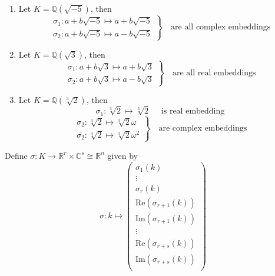 \begin{example}
    \begin{enumerate}
        \item Let $K=\mathbb{Q}(\sqrt{-5})$, then 
        \[
        \left.\begin{aligned}
            \sigma_{1}:a+b\sqrt{-5}\mapsto a+b\sqrt{-5}\\
            \sigma_{2}:a+b\sqrt{-5}\mapsto a-b\sqrt{-5}
        \end{aligned}\right\} \quad \text{are all complex embeddings}
        \]
        \item Let $K=\mathbb{Q}(\sqrt{3})$, then  
        \[
        \left.\begin{aligned}
            \sigma_{1}:a+b\sqrt{3}\mapsto a+b\sqrt{3}\\
            \sigma_{2}:a+b\sqrt{3}\mapsto a-b\sqrt{3}
        \end{aligned}\right\} \quad \text{are all real embeddings}
        \]
        \item Let $K=\mathbb{Q}(\sqrt[3]{2})$, then 
        \[
        \sigma_{1}:\sqrt[3]{2}\mapsto \sqrt[3]{2}\quad \text{ is real embedding}
        \]
        \[
        \left.\begin{aligned}
            \sigma_{2}:\sqrt[3]{2}\mapsto \sqrt[3]{2}\omega\\
            \overline{\sigma_{2}}:\sqrt[3]{2}\mapsto \sqrt[3]{2}\omega^{2}
        \end{aligned}\right\} \quad \text{are complex embeddings}
        \]
    \end{enumerate}
\end{example}

Define $\sigma:K\to \mathbb{R}^{r}\times \mathbb{C}^{s}\cong \mathbb{R}^{n}$ given by 
\[
\sigma: k\mapsto \begin{pmatrix}
    \sigma_{1}(k)\\
    \vdots\\
    \sigma_{r}(k)\\
    \mathrm{Re}(\sigma_{r+1}(k))\\
    \mathrm{Im}(\sigma_{r+1}(k))\\
    \vdots\\
    \mathrm{Re}(\sigma_{r+s}(k))\\
    \mathrm{Im}(\sigma_{r+s}(k))\\
\end{pmatrix}
\]

